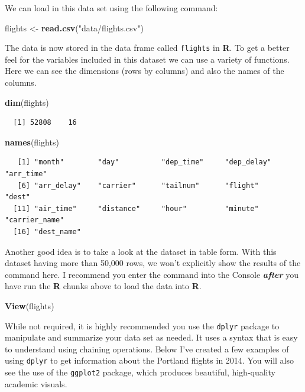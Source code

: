 \documentclass[msc,numbers]{coppe}
\newenvironment{Shaded}{\begin{snugshade}}{\end{snugshade}}
\newcommand{\KeywordTok}[1]{\textcolor[rgb]{0.13,0.29,0.53}{\textbf{#1}}}
\newcommand{\NormalTok}[1]{#1}
\newcommand{\StringTok}[1]{\textcolor[rgb]{0.31,0.60,0.02}{#1}}
\begin{document}
  We can load in this data set using the following command:
  \begin{Shaded}
  \begin{Highlighting}[]
  \NormalTok{flights <-}\StringTok{ }\KeywordTok{read.csv}\NormalTok{(}\StringTok{"data/flights.csv"}\NormalTok{)}
  \end{Highlighting}
  \end{Shaded}
  The data is now stored in the data frame called \texttt{flights} in \textbf{R}. To get a better feel for the variables included in this dataset we can use a variety of functions. Here we can see the dimensions (rows by columns) and also the names of the columns.
  \begin{Shaded}
  \begin{Highlighting}[]
  \KeywordTok{dim}\NormalTok{(flights)}
  \end{Highlighting}
  \end{Shaded}
  \begin{verbatim}
  [1] 52808    16
  \end{verbatim}
  \begin{Shaded}
  \begin{Highlighting}[]
  \KeywordTok{names}\NormalTok{(flights)}
  \end{Highlighting}
  \end{Shaded}
  \begin{verbatim}
   [1] "month"        "day"          "dep_time"     "dep_delay"    "arr_time"    
   [6] "arr_delay"    "carrier"      "tailnum"      "flight"       "dest"        
  [11] "air_time"     "distance"     "hour"         "minute"       "carrier_name"
  [16] "dest_name"   
  \end{verbatim}
  Another good idea is to take a look at the dataset in table form. With this dataset having more than 50,000 rows, we won't explicitly show the results of the command here. I recommend you enter the command into the Console \textbf{\emph{after}} you have run the \textbf{R} chunks above to load the data into \textbf{R}.
  \begin{Shaded}
  \begin{Highlighting}[]
  \KeywordTok{View}\NormalTok{(flights)}
  \end{Highlighting}
  \end{Shaded}
  While not required, it is highly recommended you use the \texttt{dplyr} package to manipulate and summarize your data set as needed. It uses a syntax that is easy to understand using chaining operations. Below I've created a few examples of using \texttt{dplyr} to get information about the Portland flights in 2014. You will also see the use of the \texttt{ggplot2} package, which produces beautiful, high-quality academic visuals.
  
\end{document}
